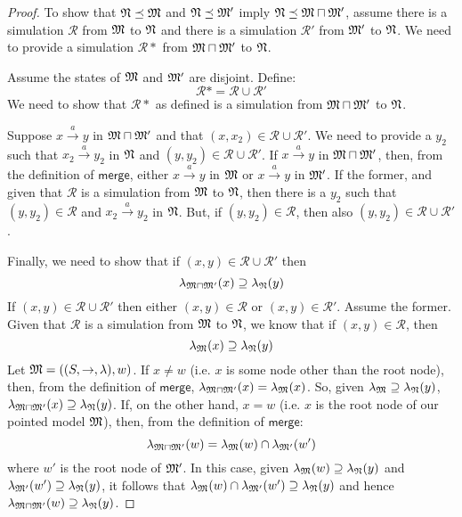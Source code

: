 \begin{proof}
To show that $\frak{N} \preceq \frak{M}$ and $\frak{N} \preceq \frak{M}'$ imply $\frak{N} \preceq \frak{M} \sqcap \frak{M}'$, assume there is a simulation $\mathcal{R}$ from $\frak{M}$ to $\frak{N}$ and there is a simulation $\mathcal{R}'$ from $\frak{M}'$ to $\frak{N}$.
We need to provide a simulation $\mathcal{R}*$ from $\frak{M} \sqcap \frak{M}'$ to $\frak{N}$.

Assume the states of $\frak{M}$ and $\frak{M}'$ are disjoint.
Define:
\[
\mathcal{R}* = \mathcal{R} \cup \mathcal{R}'
\]
We need to show that $\mathcal{R}*$ as defined is a simulation from $\frak{M} \sqcap \frak{M}'$ to $\frak{N}$.

Suppose $x \xrightarrow{a} y$ in $\frak{M} \sqcap \frak{M}'$ and that $(x,x_2) \in \mathcal{R} \cup \mathcal{R}'$.
We need to provide a $y_2$ such that $x_2 \xrightarrow{a} y_2$ in  $\frak{N}$ and $(y,y_2) \in \mathcal{R} \cup \mathcal{R}'$.
If  $x \xrightarrow{a} y$ in $\frak{M} \sqcap \frak{M}'$, then, from the definition of $\mathsf{merge}$, either $x \xrightarrow{a} y$ in $\frak{M}$ or $x \xrightarrow{a} y$ in $\frak{M}'$. If the former, and given that $\mathcal{R}$ is a simulation from $\frak{M}$ to $\frak{N}$, then there is a $y_2$ such that $(y,y_2) \in \mathcal{R}$ and $x_2 \xrightarrow{a} y_2$ in $\frak{N}$. But, if $(y,y_2) \in \mathcal{R}$, then also $(y,y_2) \in \mathcal{R} \cup \mathcal{R}'$.

Finally, we need to show that if $(x,y) \in \mathcal{R} \cup \mathcal{R}'$ then
\[
\lambda_{\frak{M} \sqcap \frak{M}'}(x) \supseteq \lambda_{\frak{N}}(y)
\]
If $(x,y) \in \mathcal{R} \cup \mathcal{R}'$ then either $(x,y) \in \mathcal{R}$ or $(x,y) \in \mathcal{R}'$.
Assume the former.
Given that $\mathcal{R}$ is a simulation from $\frak{M}$ to $\frak{N}$, we know that if $(x,y) \in \mathcal{R}$, then 
\[
\lambda_{\frak{M}}(x) \supseteq \lambda_{\frak{N}}(y)
\]
Let $\frak{M} = ((S,\rightarrow,\lambda),w)$.
If $x \neq w$ (i.e. $x$ is some node other than the root node), then, from the definition of $\mathsf{merge}$, $\lambda_{\frak{M} \sqcap \frak{M}'}(x) = \lambda_{\frak{M}}(x)$.
So, given $\lambda_{\frak{M}} \supseteq \lambda_{\frak{N}}(y)$, $\lambda_{\frak{M} \sqcap \frak{M}'}(x) \supseteq \lambda_{\frak{N}}(y)$.
If, on the other hand, $x = w$ (i.e. $x$ is the root node of our pointed model $\frak{M}$), then, from the definition of $\mathsf{merge}$:
\[
\lambda_{\frak{M} \sqcap \frak{M}'}(w) = \lambda_{\frak{M}}(w) \cap \lambda_{\frak{M}'}(w')
\]
where $w'$ is the root node of $\frak{M}'$.
In this case, given $\lambda_{\frak{M}}(w) \supseteq \lambda_{\frak{N}}(y)$ and $\lambda_{\frak{M}'}(w') \supseteq \lambda_{\frak{N}}(y)$, it follows that $\lambda_{\frak{M}}(w) \cap \lambda_{\frak{M}'}(w') \supseteq \lambda_{\frak{N}}(y)$ and hence $\lambda_{\frak{M} \sqcap \frak{M}'}(w) \supseteq \lambda_{\frak{N}}(y)$.

\end{proof}

